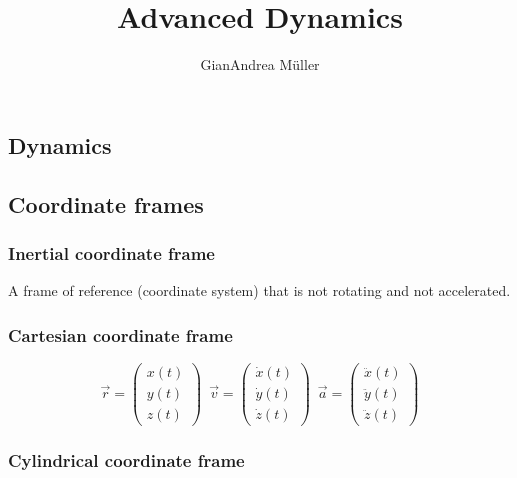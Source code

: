 \documentclass[10pt,a4paper]{scrartcl}
\title{Advanced Dynamics}
\author{GianAndrea Müller}
\begin{document}
\begin{multicols*}{4}
\maketitle
\tableofcontents
\end{multicols*}

\begin{multicols*}{2}
\section{Dynamics}
\subsection{Coordinate frames}

\subsubsection{Inertial coordinate frame}

A frame of reference (coordinate system) that is not rotating and not accelerated.

\subsubsection{Cartesian coordinate frame}

\begin{equation*}
\vec{r}=\begin{pmatrix}x(t)\\y(t)\\z(t)\end{pmatrix}
\enspace
{\vec{v}=\begin{pmatrix}\dot{x}(t)\\\dot{y}(t)\\\dot{z}(t)\end{pmatrix}}
\enspace
{\vec{a}=\begin{pmatrix}\ddot{x}(t)\\\ddot{y}(t)\\\ddot{z}(t)\end{pmatrix}}
\end{equation*}


\subsubsection{Cylindrical coordinate frame}



\end{multicols*}
\end{document}
